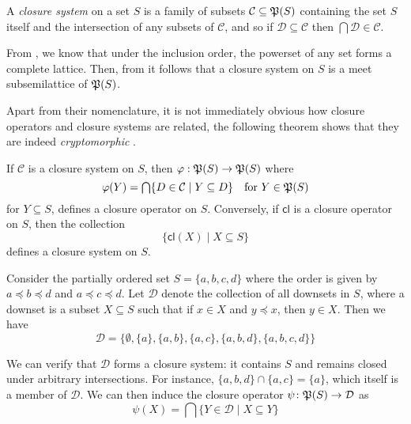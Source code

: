 \begin{definition}
	 \label{definition:closure-system}

	A \emph{closure system} on a set $S$ is a family of subsets $\mathcal{C}\subseteq \mathfrak{P}({S})$ containing the set $S$ itself
	and the intersection of any subsets of $\mathcal{C}$, and so if $\mathcal{D}\subseteq \mathcal{C}$ then
	$\bigcap \mathcal{D}\in \mathcal{C}$.
\end{definition}

From , we know that under the inclusion order, the powerset of any set forms a complete
lattice. Then, from  it follows that a closure system on $S$ is a meet subsemilattice of
$\mathfrak{P}({S})$.

Apart from their nomenclature, it is not immediately obvious how closure operators and closure systems are related, the
following theorem shows that they are indeed \textit{cryptomorphic} \cite{CASPARD2003241}.

\begin{theorem}
	\label{theorem:relation-closure-operator-systems} If $\mathcal{C}$ is a closure system on $S$, then
	$\varphi : \mathfrak{P}({S})\to \mathfrak{P}({S})$ where
	\[
		\varphi(Y) = \bigcap \{D \in \mathcal{C}\mid Y \subseteq D\} \quad \text{for }Y \in \pset{S}
	\]
	for $Y \subseteq S$, defines a closure operator on $S$. Conversely, if $\mathsf{cl}$ is a closure operator on $S$,
	then the collection
	\[
		\{\mathsf{cl}(X) \mid X \subseteq S\}
	\]
	defines a closure system on $S$.
\end{theorem}

\begin{example}
	Consider the partially ordered set $S = \{a, b, c, d\}$ where the order is given by $a \preceq b \preceq d$ and $a \preceq
	c \preceq d$. Let $\mathcal{D}$ denote the collection of all downsets in $S$, where a downset is a subset $X \subseteq
	S$ such that if $x \in X$ and $y \preceq x$, then $y \in X$. Then we have
	\[
		\mathcal{D}= \big\{\emptyset, \{a\}, \{a,b\}, \{a,c\}, \{a,b,d\}, \{a,b,c ,d\}\big\}
	\]

	We can verify that $\mathcal{D}$ forms a closure system: it contains $S$ and remains closed under arbitrary intersections.
	For instance, $\{ a,b,d\} \cap \{ a,c\} = \{a\}$, which itself is a member of $\mathcal{D}$. We can then induce the closure
	operator $\psi \colon \mathfrak{P}({S})\to \mathcal{D}$ as
	\[
		\psi(X) = \bigcap \{Y \in \mathcal{D}\mid X \subseteq Y\}
	\]
\end{example}

